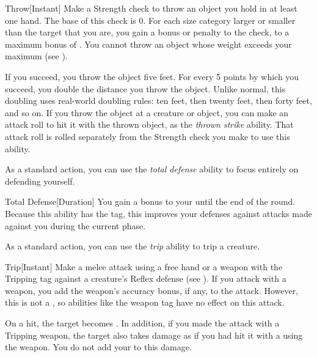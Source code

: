         \begin{instantability}{Throw}[Instant]
            \rankline
            Make a Strength check to throw an object you hold in at least one hand.
            The base  of this check is 0.
            For each size category larger or smaller than the target that you are, you gain a  bonus or penalty to the check, to a maximum bonus of .
            You cannot throw an object whose weight exceeds your maximum  (see ).

            If you succeed, you throw the object five feet.
            For every 5 points by which you succeed, you double the distance you throw the object.
            Unlike normal, this doubling uses real-world doubling rules: ten feet, then twenty feet, then forty feet, and so on.
            If you throw the object at a creature or object, you can make an attack roll to hit it with the thrown object, as the \textit{thrown strike} ability.
            That attack roll is rolled separately from the Strength check you make to use this ability.
        \end{instantability}

        \label{Total Defense} As a standard action, you can use the \textit{total defense} ability to focus entirely on defending yourself.

        \begin{durationability}{Total Defense}[Duration]
            \rankline
            You gain a  bonus to your  until the end of the round.
            Because this ability has the  tag, this improves your defenses against attacks made against you during the current phase.
        \end{durationability}

        \label{Trip} As a standard action, you can use the \textit{trip} ability to trip a creature.

        \begin{instantability}{Trip}[Instant]
            \rankline
            Make a melee attack using a free hand or a weapon with the Tripping tag against a creature's Reflex defense (see ).
            If you attack with a weapon, you add the weapon's accuracy bonus, if any, to the attack.
            However, this is not a , so abilities like the  weapon tag have no effect on this attack.

            On a hit, the target becomes \prone.
            In addition, if you made the attack with a Tripping weapon, the target also takes damage as if you had hit it with a  using the weapon.
            You do not add your  to this damage.
        \end{instantability}

